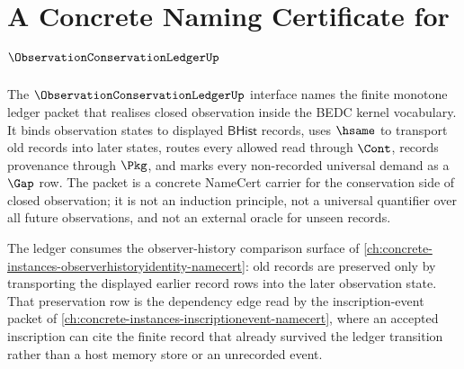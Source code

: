 \chapter{A Concrete Naming Certificate for $\ObservationConservationLedgerUp$}
\label{ch:concrete-instances-observation-conservation-ledger-namecert}

The $\ObservationConservationLedgerUp$ interface names the finite monotone ledger packet that realises closed observation inside the BEDC kernel vocabulary. It binds observation states to displayed $\mathsf{BHist}$ records, uses $\hsame$ to transport old records into later states, routes every allowed read through $\Cont$, records provenance through $\Pkg$, and marks every non-recorded universal demand as a $\Gap$ row. The packet is a concrete NameCert carrier for the conservation side of closed observation; it is not an induction principle, not a universal quantifier over all future observations, and not an external oracle for unseen records.

The ledger consumes the observer-history comparison surface of \autoref{ch:concrete-instances-observerhistoryidentity-namecert}: old records are preserved only by transporting the displayed earlier record rows into the later observation state. That preservation row is the dependency edge read by the inscription-event packet of \autoref{ch:concrete-instances-inscriptionevent-namecert}, where an accepted inscription can cite the finite record that already survived the ledger transition rather than a host memory store or an unrecorded event.

